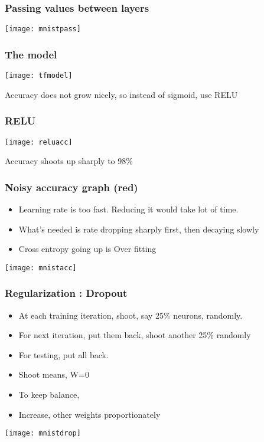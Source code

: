 \begin{frame}[fragile] \frametitle{Passing values between layers}
\begin{center}
\texttt{[image: mnistpass]}
\end{center}
\end{frame}


\begin{frame}[fragile] \frametitle{The model}
\begin{center}
\texttt{[image: tfmodel]}
\end{center}
Accuracy does not grow nicely, so instead of sigmoid, use RELU
\end{frame}

\begin{frame}[fragile] \frametitle{RELU}
\begin{center}
\texttt{[image: reluacc]}
\end{center}
Accuracy shoots up sharply to 98\%
\end{frame}

\begin{frame}[fragile] \frametitle{Noisy accuracy graph (red)}

\begin{itemize} 
\item Learning rate is too fast. Reducing it would take lot of time.
\item What's needed is rate dropping sharply first, then decaying slowly
\item Cross entropy going up is Over fitting
\end{itemize}
\begin{center}
\texttt{[image: mnistacc]}
\end{center}
\end{frame}


\begin{frame}[fragile] \frametitle{Regularization : Dropout}

\begin{itemize}
\item At each training iteration, shoot, say 25\% neurons, randomly. 
\item For next iteration, put them back, shoot another 25\% randomly
\item For testing, put all back.
\item Shoot means, W=0
\item To keep balance,
\item Increase, other weights proportionately
\end{itemize}
\begin{center}
\texttt{[image: mnistdrop]}
\end{center}
\end{frame}

